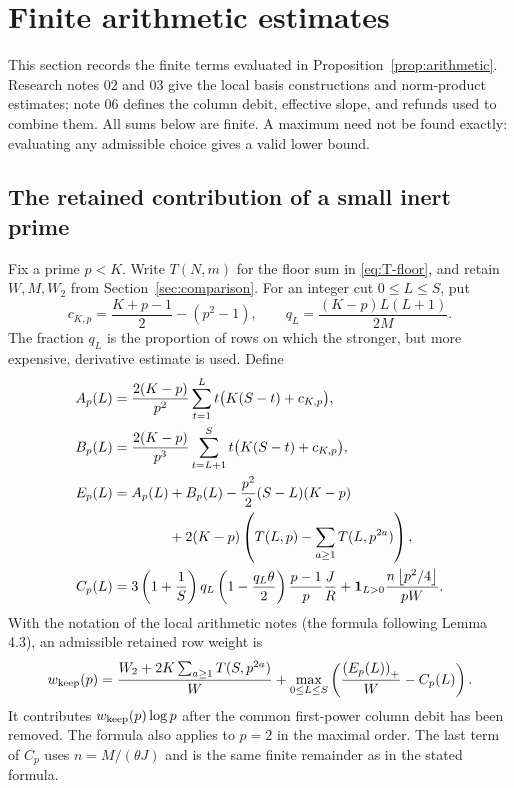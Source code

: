\section{Finite arithmetic estimates}\label{app:arithmetic}
This section records the finite terms evaluated in Proposition~\ref{prop:arithmetic}. Research notes 02 and 03 give the local basis constructions and norm-product estimates; note 06 defines the column debit, effective slope, and refunds used to combine them. All sums below are finite. A maximum need not be found exactly: evaluating any admissible choice gives a valid lower bound.

\subsection{The retained contribution of a small inert prime}
Fix a prime $p<K$. Write $T(N,m)$ for the floor sum in \eqref{eq:T-floor}, and retain $W,M,W_2$ from Section~\ref{sec:comparison}. For an integer cut $0\leq L\leq S$, put
\[
 c_{K,p}=\frac{K+p-1}{2}-(p^2-1),\qquad
 q_L=\frac{(K-p)L(L+1)}{2M}.
\]
The fraction $q_L$ is the proportion of rows on which the stronger, but more expensive, derivative estimate is used. Define
\begin{align*}
 A_p(L)&=\frac{2(K-p)}{p^2}
       \sum_{t=1}^{L}t\bigl(K(S-t)+c_{K,p}\bigr),\\
 B_p(L)&=\frac{2(K-p)}{p^3}
       \sum_{t=L+1}^{S}t\bigl(K(S-t)+c_{K,p}\bigr),\\
 E_p(L)&=A_p(L)+B_p(L)-\frac{p^2}{2}(S-L)(K-p)\\
 &\hspace{1.4cm}+2(K-p)\left(T(L,p)-\sum_{a\geq1}T(L,p^{2a})\right),\\
 C_p(L)&=3\left(1+\frac1S\right)q_L
       \left(1-\frac{q_L\theta}{2}\right)\frac{p-1}{p}\frac JR
       +\boldsymbol{1}_{L>0}\frac{n\left\lfloor p^2/4\right\rfloor}{pW}.
\end{align*}
With the notation of the local arithmetic notes (the formula following Lemma 4.3), an admissible retained row weight is
\begin{equation}\label{eq:wkeep}
 w_{\rm keep}(p)=
 \frac{W_2+2K\sum_{a\geq1}T(S,p^{2a})}{W}
 +\max_{0\leq L\leq S}
       \left(\frac{\left(E_p(L)\right)_+}W-C_p(L)\right).
\end{equation}
It contributes $w_{\rm keep}(p)\log p$ after the common first-power column debit has been removed. The formula also applies to $p=2$ in the maximal order. The last term of $C_p$ uses $n=M/(\theta J)$ and is the same finite remainder as in the stated formula.

